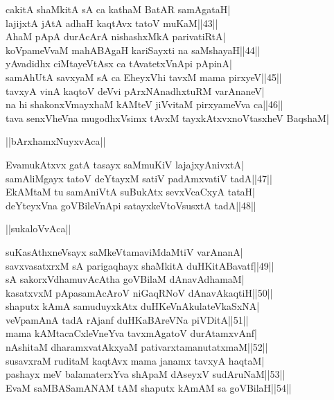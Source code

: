 \documentclass{article}
\begin{document}
cakitA shaMkitA sA ca kathaM BatAR samAgataH|\\
lajijxtA jAtA adhaH kaqtAvx tatoV muKaM||43||\\
AhaM pApA durAcArA nishashxMkA parivatiRtA|\\
koVpameVvaM mahABAgaH kariSayxti na saMshayaH||44||\\
yAvadidhx ciMtayeVtAsx ca tAvatetxVnApi pApinA|\\
samAhUtA savxyaM sA ca EheyxVhi tavxM mama pirxyeV||45||\\
tavxyA vinA kaqtoV deVvi pArxNAnadhxtuRM varAnaneV|\\
na hi shakonxVmayxhaM kAMteV jiVvitaM pirxyameVva ca||46||\\
tava senxVheVna mugodhxVsimx tAvxM tayxkAtxvxnoVtasxheV BaqshaM|\\

\begin{center}
||bArxhamxNuyxvAca||
\end{center}

EvamukAtxvx gatA tasayx saMmuKiV lajajxyAnivxtA|\\
samAliMgayx tatoV deYtayxM satiV padAmxvatiV tadA||47||\\
EkAMtaM tu samAniVtA suBukAtx sevxVcaCxyA tataH|\\
deYteyxVna goVBileVnApi satayxkeVtoVsusxtA tadA||48||\\

\begin{center}
||sukaloVvAca||
\end{center}

suKasAthxneVsayx saMkeVtamaviMdaMtiV varAnanA|\\
savxvasatxrxM sA parigaqhayx shaMkitA duHKitABavatf||49||\\
sA sakorxVdhamuvAcAtha goVBilaM dAnavAdhamaM|\\
kasatxvxM pApasamAcAroV niGaqRNoV dAnavAkaqtiH||50||\\
shaputx kAmA samuduyxkAtx duHKeVnAkulateVkaSxNA|\\
veVpamAnA tadA rAjanf duHKaBAreVNa piVDitA||51||\\
mama kAMtacaCxleVneYva tavxmAgatoV durAtamxvAnf|\\
nAshitaM dharamxvatAkxyaM pativarxtamanutatxmaM||52||\\
susavxraM ruditaM kaqtAvx mama janamx tavxyA haqtaM|\\
pashayx meV balamaterxYva shApaM dAseyxV sudAruNaM||53||\\
EvaM saMBASamANAM tAM shaputx kAmAM sa goVBilaH||54||
\end{document}
